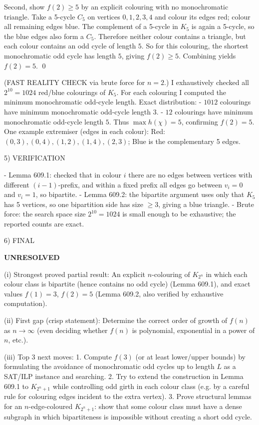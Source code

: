 Second, show $f(2)\ge 5$ by an explicit colouring with no monochromatic triangle.
Take a 5-cycle $C_5$ on vertices $0,1,2,3,4$ and colour its edges red; colour all remaining edges blue.
The complement of a 5-cycle in $K_5$ is again a 5-cycle, so the blue edges also form a $C_5$.
Therefore neither colour contains a triangle, but each colour contains an odd cycle of length $5$.
So for this colouring, the shortest monochromatic odd cycle has length $5$, giving $f(2)\ge 5$.
Combining yields $f(2)=5$.
\qed

(FAST REALITY CHECK via brute force for $n=2$.)
I exhaustively checked all $2^{10}=1024$ red/blue colourings of $K_5$.
For each colouring I computed the minimum monochromatic odd-cycle length.
Exact distribution:
- $1012$ colourings have minimum monochromatic odd-cycle length $3$.
- $12$ colourings have minimum monochromatic odd-cycle length $5$.
Thus $\max h(\chi)=5$, confirming $f(2)=5$.
One example extremiser (edges in each colour):
Red: $(0,3),(0,4),(1,2),(1,4),(2,3)$; Blue is the complementary 5 edges.

5) VERIFICATION

- Lemma 609.1: checked that in colour $i$ there are no edges between vertices with different $(i-1)$-prefix, and within a fixed prefix all edges go between $v_i=0$ and $v_i=1$, so bipartite.
- Lemma 609.2: the bipartite argument uses only that $K_5$ has 5 vertices, so one bipartition side has size $\ge 3$, giving a blue triangle.
- Brute force: the search space size $2^{10}=1024$ is small enough to be exhaustive; the reported counts are exact.

6) FINAL

\textbf{UNRESOLVED}

(i) Strongest proved partial result:
An explicit $n$-colouring of $K_{2^n}$ in which each colour class is bipartite (hence contains no odd cycle) (Lemma 609.1), and exact values $f(1)=3$, $f(2)=5$ (Lemma 609.2, also verified by exhaustive computation).

(ii) First gap (crisp statement):
Determine the correct order of growth of $f(n)$ as $n\to\infty$ (even deciding whether $f(n)$ is polynomial, exponential in a power of $n$, etc.).

(iii) Top 3 next moves:
1. Compute $f(3)$ (or at least lower/upper bounds) by formulating the avoidance of monochromatic odd cycles up to length $L$ as a SAT/ILP instance and searching.
2. Try to extend the construction in Lemma 609.1 to $K_{2^n+1}$ while controlling odd girth in each colour class (e.g. by a careful rule for colouring edges incident to the extra vertex).
3. Prove structural lemmas for an $n$-edge-coloured $K_{2^n+1}$: show that some colour class must have a dense subgraph in which bipartiteness is impossible without creating a short odd cycle.

